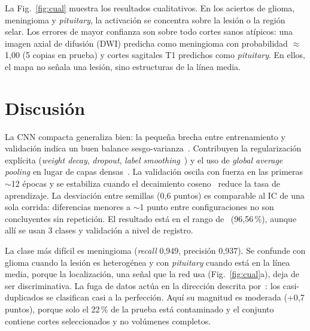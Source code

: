 \documentclass[letterpaper, 10 pt, conference]{ieeeconf}  %
\begin{document}
La Fig.~\ref{fig:cual} muestra los resultados cualitativos. En los aciertos de glioma, meningioma y \textit{pituitary}, la activación se concentra sobre la lesión o la región selar. Los errores de mayor confianza son sobre todo cortes sanos atípicos: una imagen axial de difusión (DWI) predicha como meningioma con probabilidad $\approx$1,00 (5 copias en prueba) y cortes sagitales T1 predichos como \textit{pituitary}. En ellos, el mapa no señala una lesión, sino estructuras de la línea media.

\section{Discusión}
La CNN compacta generaliza bien: la pequeña brecha entre entrenamiento y validación indica un buen balance sesgo-varianza~\cite{c15}. Contribuyen la regularización explícita (\textit{weight decay}, \textit{dropout}, \textit{label smoothing}~\cite{c12}) y el uso de \textit{global average pooling} en lugar de capas densas~\cite{c11}. La validación oscila con fuerza en las primeras $\sim$12 épocas y se estabiliza cuando el decaimiento coseno~\cite{c14} reduce la tasa de aprendizaje. La desviación entre semillas (0,6 puntos) es comparable al IC de una sola corrida: diferencias menores a $\sim$1 punto entre configuraciones no son concluyentes sin repetición. El resultado está en el rango de~\cite{c6} (96,56\,\%), aunque allí se usan 3 clases y validación a nivel de registro.

La clase más difícil es meningioma (\textit{recall} 0,949, precisión 0,937). Se confunde con glioma cuando la lesión es heterogénea y con \textit{pituitary} cuando está en la línea media, porque la localización, una señal que la red usa (Fig.~\ref{fig:cual}a), deja de ser discriminativa. La fuga de datos actúa en la dirección descrita por~\cite{c7}: los casi-duplicados se clasifican casi a la perfección. Aquí su magnitud es moderada (+0,7 puntos), porque solo el 22\,\% de la prueba está contaminado y el conjunto contiene cortes seleccionados y no volúmenes completos.
\end{document}
